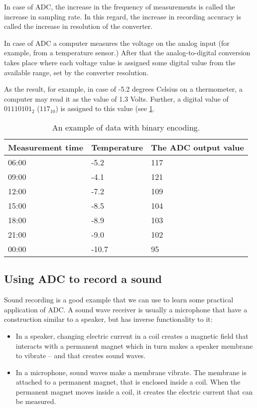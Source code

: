 \documentclass[../sparc.tex]{subfiles}
\begin{document}
In case of ADC, the increase in the frequency of measurements is called the
increase in sampling rate.  In this regard, the increase in recording accuracy
is called the increase in resolution of the converter.

In case of ADC a computer measures the voltage on the analog input (for example,
from a temperature sensor.)  After that the analog-to-digital conversion takes
place where each voltage value is assigned some digital value from the available
range, set by the converter resolution.

As the result, for example, in case of -5.2 degrees Celsius on a thermometer, a
computer may read it as the value of 1.3 Volts.  Further, a digital value of
$01110101_2$ ($117_{10}$) is assigned to this value (see
\ref{table:adc-temperature-data-example-4}.

\begin{table}[h]
  \centering
  \begin{tabular}{p{3cm}|p{4cm}|p{4cm}}
    Measurement time & Temperature & The ADC output value \\
    \hline \hline
    06:00 & -5.2  & 117 \\
    \hline
    09:00 & -4.1  & 121 \\
    \hline
    12:00 & -7.2  & 109 \\
    \hline
    15:00 & -8.5  & 104 \\
    \hline
    18:00 & -8.9  & 103 \\
    \hline
    21:00 & -9.0  & 102 \\
    \hline
    00:00 & -10.7 & 95 \\
    \hline
  \end{tabular}
  \caption{An example of data with binary encoding.}
  \label{table:adc-temperature-data-example-4}
\end{table}

\subsection{Using ADC to record a sound}

Sound recording is a good example that we can use to learn some practical
application of ADC.  A sound wave receiver is usually a microphone that have a
construction similar to a speaker, but has inverse functionality to it:

\begin{itemize}
\item In a speaker, changing electric current in a coil creates a magnetic field
  that interacts with a permanent magnet which in turn makes a speaker membrane
  to vibrate -- and that creates sound waves.
\item In a microphone, sound waves make a membrane vibrate.  The membrane is
  attached to a permanent magnet, that is enclosed inside a coil.  When the
  permanent magnet moves inside a coil, it creates the electric current that can
  be measured.
\end{itemize}
\end{document}
